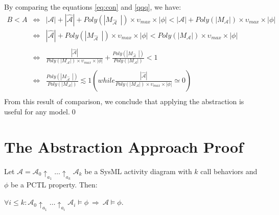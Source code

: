 By comparing the equations \ref{eq:con} and \ref{qqq}, we have:
\begin{equation*}
\begin{array}{rcll}
B<A&\Leftrightarrow&|\mathcal{A}|+|\widehat{\mathcal{A}}|+Poly(|M_{\widehat{\mathcal{A}}}~~|)\times \upsilon_{max}\times |\phi|<|\mathcal{A}|+Poly(|M_{\mathcal{A}}|)\times \upsilon_{max}\times |\phi|\\
&\Leftrightarrow&|\widehat{\mathcal{A}}|+Poly(|M_{\widehat{\mathcal{A}}}~~|)\times \upsilon_{max}\times |\phi|<Poly(|M_{\mathcal{A}}|)\times \upsilon_{max}\times |\phi|\\
\\
&\Leftrightarrow&\frac{|\widehat{\mathcal{A}}|}{Poly(|M_{\mathcal{A}}|)\times \upsilon_{max}\times |\phi|}+\frac{Poly(|M_{\widehat{\mathcal{A}}}~~|)}{Poly(|M_{\mathcal{A}}|)} <1\\
\\&\Leftrightarrow&\frac{Poly(|M_{\widehat{\mathcal{A}}}~~|)}{Poly(|M_{\mathcal{A}}|)} \lesssim 1 (while \frac{|\widehat{\mathcal{A}}|}{Poly(|M_{\mathcal{A}}|)\times \upsilon_{max}\times |\phi|}\simeq0)\\
\end{array}
\label{eq:abs}
\end{equation*}
From this result of comparison, we conclude that applying the abstraction is useful for any model.\qed
\setcounter{proposition}{0}

\section{The Abstraction Approach Proof}\label{sub:AbstProof}

\begin{proposition}%
Let $\mathcal{A}= \mathcal{A}_{0}\uparrow_{a_{1}}\ldots\uparrow_{a_{k}}\mathcal{A}_{k}$ be a SysML activity diagram with $k$ call behaviors and $\phi$ be a PCTL property. Then: \begin{center}$\forall i\leq k: \mathcal{A}_{0}\uparrow_{a_{1}}\ldots\uparrow_{a_{i}}\mathcal{A}_{i}\models\phi~\Rightarrow~\mathcal{A}\models\phi$.\end{center}
\end{proposition}

